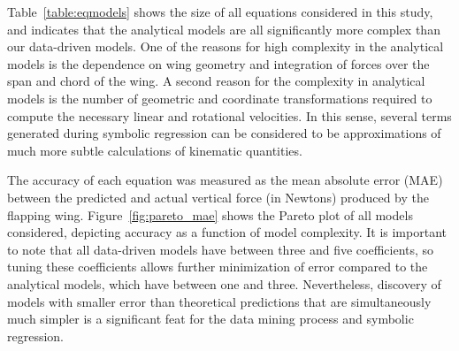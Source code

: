 \documentclass{article}
\begin{document}
Table~\ref{table:eqmodels} shows the size of all equations considered in this
study, and indicates that the analytical models are all significantly more
complex than our data-driven models.  One of the reasons for high complexity in
the analytical models is the dependence on wing geometry and integration of
forces over the span and chord of the wing.  A second reason for the complexity
in analytical models is the number of geometric and coordinate transformations
required to compute the necessary linear and rotational velocities.  In this
sense, several terms generated during symbolic regression can be considered to
be approximations of much more subtle calculations of kinematic quantities.

The accuracy of each equation was measured as the mean absolute error (MAE)
between the predicted and actual vertical force (in Newtons) produced by the
flapping wing.  Figure~\ref{fig:pareto_mae} shows the Pareto plot of all models
considered, depicting accuracy as a function of model complexity. It is
important to note that all data-driven models have between three and five
coefficients, so tuning these coefficients allows further minimization of error
compared to the analytical models, which have between one and three.
Nevertheless, discovery of models with smaller error than theoretical
predictions that are simultaneously much simpler is a significant feat for the
data mining process and symbolic regression.
\end{document}
